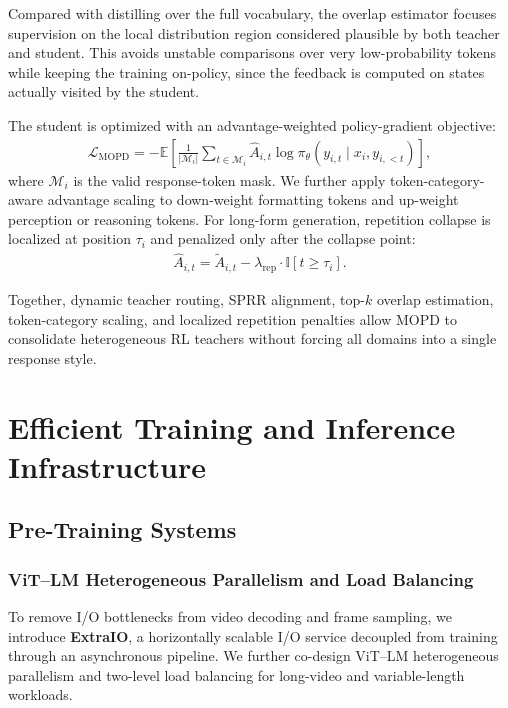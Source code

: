 \documentclass{article} %
\begin{document}
Compared with distilling over the full vocabulary, the overlap estimator focuses supervision on the local distribution region considered plausible by both teacher and student. This avoids unstable comparisons over very low-probability tokens while keeping the training on-policy, since the feedback is computed on states actually visited by the student.

The student is optimized with an advantage-weighted policy-gradient objective:
\begin{align}
    \mathcal{L}_{\mathrm{MOPD}}=
    -\mathbb{E}
    \left[
    \frac{1}{|\mathcal{M}_i|}
    \sum_{t\in \mathcal{M}_i}
    \widehat{A}_{i,t}
    \log \pi_\theta(y_{i,t}\mid x_i,y_{i,<t})
    \right],
\end{align}
where $\mathcal{M}_i$ is the valid response-token mask. We further apply token-category-aware advantage scaling to down-weight formatting tokens and up-weight perception or reasoning tokens. For long-form generation, repetition collapse is localized at position $\tau_i$ and penalized only after the collapse point:
\begin{align}
    \widehat{A}_{i,t}=
    \widetilde{A}_{i,t} -
    \lambda_{\mathrm{rep}}\cdot \mathbb{I}[t\ge \tau_i].
\end{align}

Together, dynamic teacher routing, SPRR alignment, top-$k$ overlap estimation, token-category scaling, and localized repetition penalties allow MOPD to consolidate heterogeneous RL teachers without forcing all domains into a single response style.


\section{Efficient Training and Inference Infrastructure}

\subsection{Pre-Training Systems}

\subsubsection{ViT--LM Heterogeneous Parallelism and Load Balancing}

To remove I/O bottlenecks from video decoding and frame sampling, we introduce \textbf{ExtraIO}, a horizontally scalable I/O service decoupled from training through an asynchronous pipeline. We further co-design ViT--LM heterogeneous parallelism and two-level load balancing for long-video and variable-length workloads.
\end{document}
